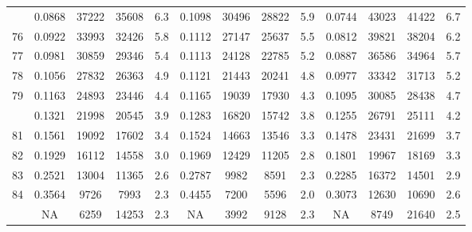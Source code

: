 \documentclass[
  14pt,
]{article}
\begin{document}
\begin{longtable}[t]{lcccccccccccc}
\addlinespace
75 & 0.0868 & 37222 & 35608 & 6.3 & 0.1098 & 30496 & 28822 & 5.9 & 0.0744 & 43023 & 41422 & 6.7\\
76 & 0.0922 & 33993 & 32426 & 5.8 & 0.1112 & 27147 & 25637 & 5.5 & 0.0812 & 39821 & 38204 & 6.2\\
77 & 0.0981 & 30859 & 29346 & 5.4 & 0.1113 & 24128 & 22785 & 5.2 & 0.0887 & 36586 & 34964 & 5.7\\
78 & 0.1056 & 27832 & 26363 & 4.9 & 0.1121 & 21443 & 20241 & 4.8 & 0.0977 & 33342 & 31713 & 5.2\\
79 & 0.1163 & 24893 & 23446 & 4.4 & 0.1165 & 19039 & 17930 & 4.3 & 0.1095 & 30085 & 28438 & 4.7\\
\addlinespace
80 & 0.1321 & 21998 & 20545 & 3.9 & 0.1283 & 16820 & 15742 & 3.8 & 0.1255 & 26791 & 25111 & 4.2\\
81 & 0.1561 & 19092 & 17602 & 3.4 & 0.1524 & 14663 & 13546 & 3.3 & 0.1478 & 23431 & 21699 & 3.7\\
82 & 0.1929 & 16112 & 14558 & 3.0 & 0.1969 & 12429 & 11205 & 2.8 & 0.1801 & 19967 & 18169 & 3.3\\
83 & 0.2521 & 13004 & 11365 & 2.6 & 0.2787 & 9982 & 8591 & 2.3 & 0.2285 & 16372 & 14501 & 2.9\\
84 & 0.3564 & 9726 & 7993 & 2.3 & 0.4455 & 7200 & 5596 & 2.0 & 0.3073 & 12630 & 10690 & 2.6\\
\addlinespace
85 & NA & 6259 & 14253 & 2.3 & NA & 3992 & 9128 & 2.3 & NA & 8749 & 21640 & 2.5\\*
\end{longtable}
\end{document}
